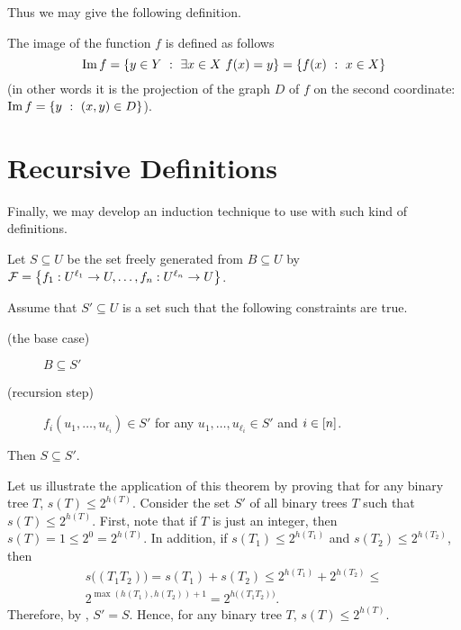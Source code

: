Thus we may give the following definition.
\begin{definition}
    The image of the function $f$ is defined as follows
    \[
        \Im f = \set[\exists x \in X\ f(x) = y]{y \in Y}
        = \set[x \in X]{f(x)}
    \]
    (in other words it is the projection of the graph $D$ of $f$ on the second
    coordinate: $\Im f = \set[(x, y) \in D]{y}$).
\end{definition}

\section{Recursive Definitions}

Finally, we may develop an induction technique to use with such kind of
definitions.
\begin{theorem}
\label{theorem:structural-induction}
    Let $S \subseteq U$ be the set freely generated from $B \subseteq U$ by
    $\mathcal{F} = \set{f_1 : U^{\ell_1} \to U, \dots, f_n : U^{\ell_n} \to U}$.

    Assume that $S' \subseteq U$ is a set such that the following constraints
    are true.
    \begin{description}
        \item [(the base case)] $B \subseteq S'$
        \item[(recursion step)] $f_i(u_1, \dots, u_{\ell_i}) \in S'$ for any
            $u_1, \dots, u_{\ell_i} \in S'$ and $i \in {[{n}]}$.
    \end{description}
    Then $S \subseteq S'$.
\end{theorem}

Let us illustrate the application of this theorem by proving that for any
binary tree $T$, $s(T) \le 2^{h(T)}$.
Consider the set $S'$ of all binary trees $T$ such that $s(T) \le 2^{h(T)}$.
First, note that if $T$ is just an integer, then $s(T) = 1 \le 2^0 = 2^{h(T)}$.
In addition, if $s(T_1) \le 2^{h(T_1)}$ and $s(T_2) \le 2^{h(T_2)}$, then
\begin{multline*}
    s\big( (T_1 T_2) \big) = s(T_1) + s(T_2) \le 2^{h(T_1)} + 2^{h(T_2)} \le \\
    2^{\max(h(T_1), h(T_2)) + 1} = 2^{h\big( (T_1 T_2) \big)}.
\end{multline*}
Therefore, by , $S' = S$. Hence, for any
binary tree $T$, $s(T) \le 2^{h(T)}$.

